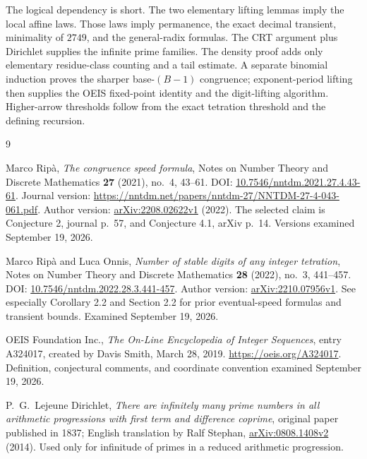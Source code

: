 \documentclass[11pt,letterpaper]{article}
\numberwithin{equation}{section}
\theoremstyle{definition}
\theoremstyle{remark}
\begin{document}
The logical dependency is short. The two elementary lifting lemmas imply the local affine laws. Those laws imply permanence, the exact decimal transient, minimality of $2749$, and the general-radix formulas. The CRT argument plus Dirichlet supplies the infinite prime families. The density proof adds only elementary residue-class counting and a tail estimate. A separate binomial induction proves the sharper base-$(B-1)$ congruence; exponent-period lifting then supplies the OEIS fixed-point identity and the digit-lifting algorithm. Higher-arrow thresholds follow from the exact tetration threshold and the defining recursion.

\begingroup
\small
\setlength{\parskip}{0pt}
\begin{thebibliography}{9}
\setlength{\itemsep}{3pt}

Marco Rip\`a,
\emph{The congruence speed formula},
Notes on Number Theory and Discrete Mathematics \textbf{27} (2021), no.~4, 43--61.
DOI: \href{https://doi.org/10.7546/nntdm.2021.27.4.43-61}{10.7546/nntdm.2021.27.4.43-61}.
Journal version: \url{https://nntdm.net/papers/nntdm-27/NNTDM-27-4-043-061.pdf}.
Author version: \href{https://arxiv.org/abs/2208.02622v1}{arXiv:2208.02622v1} (2022).
The selected claim is Conjecture 2, journal p.~57, and Conjecture 4.1, arXiv p.~14. Versions examined September 19, 2026.

Marco Rip\`a and Luca Onnis,
\emph{Number of stable digits of any integer tetration},
Notes on Number Theory and Discrete Mathematics \textbf{28} (2022), no.~3, 441--457.
DOI: \href{https://doi.org/10.7546/nntdm.2022.28.3.441-457}{10.7546/nntdm.2022.28.3.441-457}.
Author version: \href{https://arxiv.org/abs/2210.07956v1}{arXiv:2210.07956v1}.
See especially Corollary 2.2 and Section 2.2 for prior eventual-speed formulas and transient bounds.
Examined September 19, 2026.

OEIS Foundation Inc.,
\emph{The On-Line Encyclopedia of Integer Sequences}, entry A324017,
created by Davis Smith, March 28, 2019.
\url{https://oeis.org/A324017}.
Definition, conjectural comments, and coordinate convention examined September 19, 2026.

P.~G.~Lejeune Dirichlet,
\emph{There are infinitely many prime numbers in all arithmetic progressions with first term and difference coprime},
original paper published in 1837; English translation by Ralf Stephan,
\href{https://arxiv.org/abs/0808.1408v2}{arXiv:0808.1408v2} (2014).
Used only for infinitude of primes in a reduced arithmetic progression.

\end{thebibliography}
\endgroup
\end{document}
